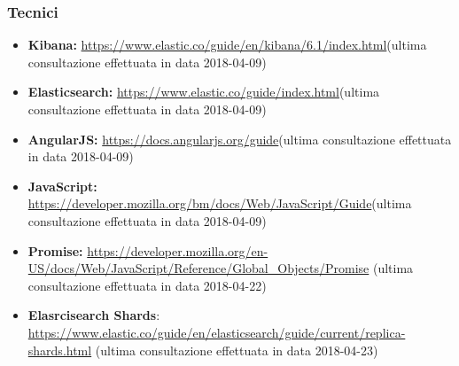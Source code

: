 \subsubsection{Tecnici}
\begin{itemize}
	\item \textbf{Kibana:} \href{https://www.elastic.co/guide/en/kibana/6.1/index.html}{https://www.elastic.co/guide/en/kibana/6.1/index.html}(ultima consultazione effettuata in data 2018-04-09)
	\item \textbf{Elasticsearch:} \href{https://www.elastic.co/guide/index.html}{https://www.elastic.co/guide/index.html}(ultima consultazione effettuata in data 2018-04-09)
	\item \textbf{AngularJS:} \href{https://docs.angularjs.org/guide}{https://docs.angularjs.org/guide}(ultima consultazione effettuata in data 2018-04-09)
	\item \textbf{JavaScript:} \href{https://developer.mozilla.org/bm/docs/Web/JavaScript/Guide}{https://developer.mozilla.org/bm/docs/Web/JavaScript/Guide}(ultima consultazione effettuata in data 2018-04-09) 
	\item \textbf{Promise:} \href{https://developer.mozilla.org/en-US/docs/Web/JavaScript/Reference/Global\_Objects/Promise}{https://developer.mozilla.org/en-US/docs/Web/JavaScript/Reference/Global\_Objects/Promise} (ultima consultazione effettuata in data 2018-04-22) 
	\item \textbf{Elasrcisearch Shards}: \href{https://www.elastic.co/guide/en/elasticsearch/guide/current/replica-shards.html}{https://www.elastic.co/guide/en/elasticsearch/guide/current/replica-shards.html} (ultima consultazione effettuata in data 2018-04-23) 
\end{itemize}

